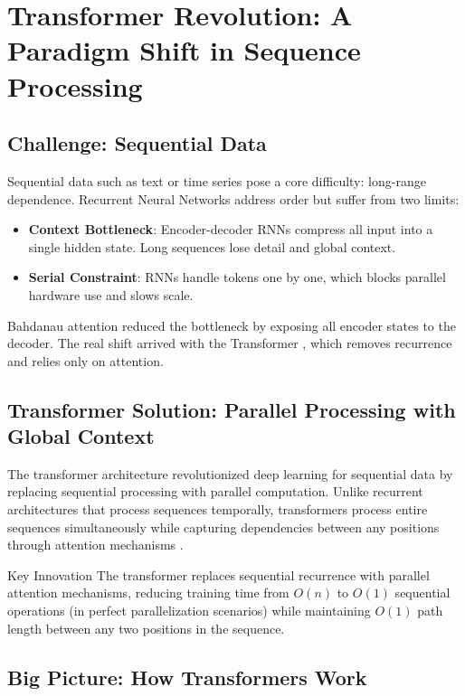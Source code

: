 \section{Transformer Revolution: A Paradigm Shift in Sequence Processing}
\subsection{Challenge: Sequential Data}

Sequential data such as text or time series pose a core difficulty: long-range dependence. Recurrent Neural Networks address order but suffer from two limits:

\begin{itemize}
  \item \textbf{Context Bottleneck}: Encoder-decoder RNNs compress all input into a single hidden state. Long sequences lose detail and global context.
  \item \textbf{Serial Constraint}: RNNs handle tokens one by one, which blocks parallel hardware use and slows scale.
\end{itemize}

Bahdanau attention reduced the bottleneck by exposing all encoder states to the decoder. The real shift arrived with the Transformer \cite{vaswani2017attention}, which removes recurrence and relies only on attention.


\subsection{Transformer Solution: Parallel Processing with Global Context}

The transformer architecture revolutionized deep learning for sequential data by replacing sequential processing with parallel computation. Unlike recurrent architectures that process sequences temporally, transformers process entire sequences simultaneously while capturing dependencies between any positions through attention mechanisms \cite{Bahdanau2014}.

\begin{calloutbox}{Key Innovation}
  The transformer replaces sequential recurrence with parallel attention mechanisms, reducing training time from $O(n)$ to $O(1)$ sequential operations (in perfect parallelization scenarios) while maintaining $O(1)$ path length between any two positions in the sequence.
\end{calloutbox}

\subsection{Big Picture: How Transformers Work}

